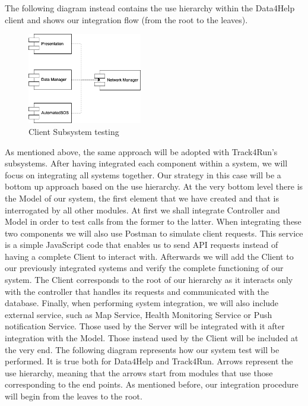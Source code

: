 \documentclass[titlepage]{article}
\begin{document}
The following diagram instead contains the use hierarchy within the Data4Help client and shows our integration flow (from the root to the leaves).
\begin{figure}[H]
	\center
  	\includegraphics[width=5cm]{clientSubsystemTesting.png}
  	\caption{Client Subsystem testing}
 	\label{fig:clientSubsystemTesting}
\end{figure} 
As mentioned above, the same approach will be adopted with Track4Run’s subsystems.
\newline
\newline
After having integrated each component within a system, we will focus on integrating all systems together. Our strategy in this case will be a bottom up approach based on the use hierarchy. At the very bottom level there is the Model of our system, the first element that we have created and that is interrogated by all other modules. At first we shall integrate Controller and Model in order to test calls from the former to the latter. When integrating these two components we will also use Postman to simulate client requests. This service is a simple JavaScript code that enables us to send API requests instead of having a complete Client to interact with. 
Afterwards we will add the Client to our previously integrated systems and verify the complete functioning of our system. The Client corresponds to the root of our hierarchy as it interacts only with the controller that handles its requests and communicated with the database.
Finally, when performing system integration, we will also include external service, such as Map Service, Health Monitoring Service or Push notification Service. Those used by the Server will be integrated with it after integration with the Model. Those instead used by the Client will be included at the very end.
\newline
\newline
The following diagram represents how our system test will be performed. It is true both for Data4Help and Track4Run. Arrows represent the use hierarchy, meaning that the arrows start from modules that use those corresponding to the end points. As mentioned before, our integration procedure will begin from the leaves to the root.
\end{document}
